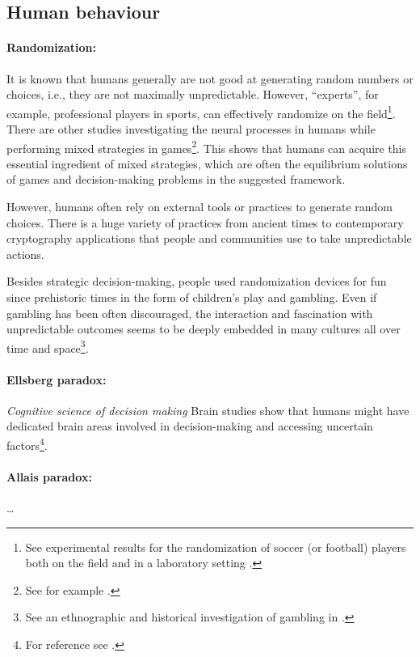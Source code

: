 \documentclass{article}
\begin{document}
\subsection*{Human behaviour}

\paragraph{Randomization:}
It is known that humans generally are not good at generating random numbers or choices, i.e., they are not maximally unpredictable. However, ``experts'', for example, professional players in sports, can effectively randomize on the field\footnote{See experimental results for the randomization of soccer (or football) players both on the field and in a laboratory setting \cite{paper:MinimaxExperiment01,paper:MinimaxExperiment02,paper:MinimaxExperiment03}.}. There are other studies investigating the neural processes in humans while performing mixed strategies in games\footnote{See for example \cite{paper:PrimateRandomArticle}.}.
This shows that humans can acquire this essential ingredient of mixed strategies, which are often the equilibrium solutions of games and decision-making problems in the suggested framework.

However, humans often rely on external tools or practices to generate random choices. There is a huge variety of practices from ancient times to contemporary cryptography applications that people and communities use to take unpredictable actions.

Besides strategic decision-making, people used randomization devices for fun since prehistoric times in the form of children's play and gambling. Even if gambling has been often discouraged, the interaction and fascination with unpredictable outcomes seems to be deeply embedded in many cultures all over time and space\footnote{See an ethnographic and historical investigation of gambling in \cite{paper:GamblingAcrossCultures}.}.

\paragraph{Ellsberg paradox:}
{\it Cognitive science of decision making}
Brain studies show that humans might have dedicated brain areas involved in decision-making and accessing uncertain factors\footnote{For reference see \cite{thesis:NeuralDecisionMaking}.}.


\paragraph{Allais paradox:}
\dots 
\end{document}
